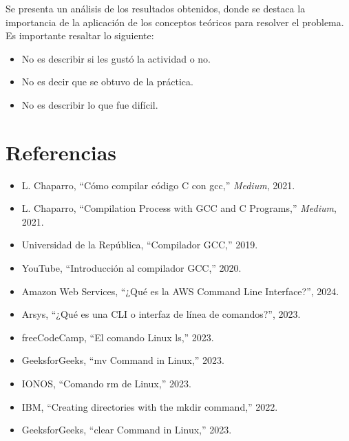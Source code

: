 \documentclass[letterpaper,12pt,oneside]{article}
\begin{document}
Se presenta un análisis de los resultados obtenidos, donde se destaca la importancia de la aplicación de los conceptos teóricos para resolver el problema. Es importante resaltar lo siguiente:

\begin{itemize}
    \item No es describir si les gustó la actividad o no.
    \item No es decir que se obtuvo de la práctica.
    \item No es describir lo que fue difícil.
\end{itemize}

\clearpage
\section*{Referencias}

\begin{itemize}
    \item [1] L. Chaparro, “Cómo compilar código C con gcc,” \textit{Medium}, 2021.
    \item [2] L. Chaparro, “Compilation Process with GCC and C Programs,” \textit{Medium}, 2021.
    \item [3] Universidad de la República, “Compilador GCC,” 2019.
    \item [4] YouTube, “Introducción al compilador GCC,” 2020.
    \item [5] Amazon Web Services, “¿Qué es la AWS Command Line Interface?”, 2024.
    \item [6] Arsys, “¿Qué es una CLI o interfaz de línea de comandos?”, 2023.
    \item [7] freeCodeCamp, “El comando Linux ls,” 2023.
    \item [8] GeeksforGeeks, “mv Command in Linux,” 2023.
    \item [9] IONOS, “Comando rm de Linux,” 2023.
    \item [10] IBM, “Creating directories with the mkdir command,” 2022.
    \item [11] GeeksforGeeks, “clear Command in Linux,” 2023.
\end{itemize}
\end{document}
